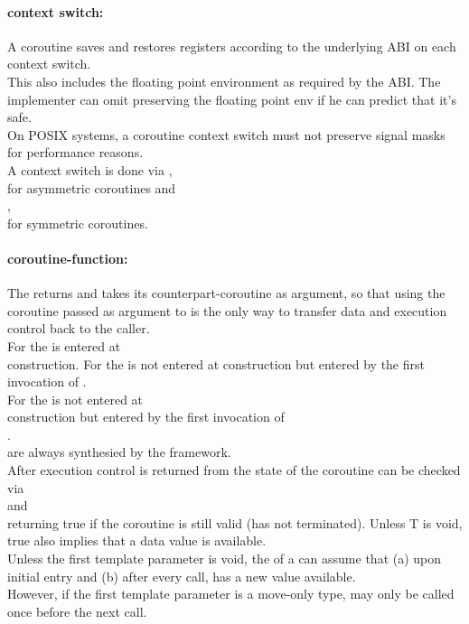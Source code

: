 \paragraph*{context switch:}
A coroutine saves and restores registers according to the underlying ABI on
each context switch.\\
\newline
This also includes the floating point environment as required by the ABI. The
implementer can omit preserving the floating point env if he can predict that
it's safe.\\
On POSIX systems, a coroutine context switch must not preserve signal masks for performance
reasons.\\
A context switch is done via \pushcoroop,\\
\pullcoroop for asymmetric coroutines and\\
\callcoroop,\\
\yieldcoroop for symmetric coroutines.

\paragraph*{coroutine-function:}
The \corofunction returns  and takes its counterpart-coroutine as
argument, so that using the coroutine passed as argument to \corofunction is the
only way to transfer data and execution control back to the caller.\\
\newline
For \pullcoro the \corofunction is entered at\\
\pullcoro construction.
For \pushcoro the \corofunction is not entered at \pushcoro construction but
entered by the first invocation of \pushcoroop.\\
\newline
For \callcoro the \corofunction is not entered at\\
\callcoro construction but entered by the first invocation of\\
\callcoroop.\\
\yieldcoro are always synthesied by the framework.\\
After execution control is returned from \corofunction the state of the
coroutine can be checked via\\
\pullcorobool and\\
\callcorobool returning true if the coroutine is still valid (\corofunction has
not terminated). Unless T is void, true also implies that a data value is
available.\\
\newline
Unless the first template parameter is void, the \corofunction of a \callcoro
can assume that (a) upon initial entry and (b) after every \yieldcoroop call,
\yieldcoroget has a new value available.\\
However, if the first template parameter is a move-only type, \yieldcoroget may
only be called once before the next \yieldcoroop call.

